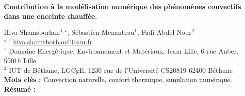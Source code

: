 


    \newpage

\BgThispage

%
\begin{flushleft}
\addtocounter{section}{1}
{\Large \textbf{Contribution à la modélisation numérique des phénomènes convectifs dans une enceinte chauffée.}}\label{ref:78}
\end{flushleft}
%
Hiva Shamsborhan$^{1,\star}$, Sébastien Menanteau$^{1}$, Fadi Abdel Nour$^{2}$\\[2mm]
$^{\star}$ \Letter : \url{hiva.shamsborhan@icam.fr}\\[2mm]
{\footnotesize $^{1}$ Domaine Energétique, Environnement et Matériaux, Icam Lille, 6 rue Auber, 59016 Lille}\\
{\footnotesize $^{2}$ IUT de Béthune, LGCgE, 1230 rue de l'Université CS20819 62400 Béthune}\\
[4mm]
%
\noindent \textbf{Mots clés : } Convection naturelle, confort thermique, simulation numérique.\\[4mm]
%
\noindent \textbf{Résumé : } 

